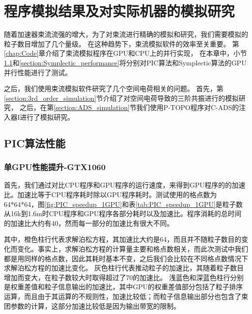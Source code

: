 \chapter{程序模拟结果及对实际机器的模拟研究} \label{chap:Simulation}
随着加速器束流流强的增大，为了对束流进行精确的模拟和研究，我们需要模拟的粒子数目增加了几个量级。
在这种趋势下，束流模拟软件的效率至关重要。
第\ref{chap:Code}章介绍了束流模拟程序在GPU和CPU上的并行实现，
在本章中，小节\ref{section:PIC_performance}和\ref{section:Symplectic_performance}将分别对PIC算法和Symplectic算法的GPU并行性能进行了测试。

之后，我们使用束流模拟软件研究了几个空间电荷相关的问题。
首先，第\ref{section:3rd_order_simulation}节介绍了对空间电荷导致的三阶共振进行的模拟研究，
之后，在第\ref{section:ADS_simulation}节我们使用P-TOPO程序对C-ADS的注入器I进行了模拟研究。

\section{PIC算法性能}             \label{section:PIC_performance}

\subsection{单GPU性能提升-GTX1060}
首先，我们通过对比CPU程序和GPU程序的运行速度，来得到GPU程序的的加速比。加速比等于CPU程序耗时除以GPU程序耗时。测试使用的格点数为 64*64*64，图\ref{fig:PIC_speedup_1GPU}和表\ref{tab:PIC_speedup_1GPU}是粒子数从16k到1.6m时CPU程序和GPU程序各部分耗时以及加速比。程序消耗的总时间的加速比大约有40，然而每一部分的加速比有很大不同。

其中，橙色柱行代表求解泊松方程，其加速比大约是64，而且并不随粒子数目的变化而变化。事实上，求解泊松方程的计算量主要和格点数相关，而此次测试中我们都是用同样的格点数，因此其耗时基本不变，之后我们会比较在不同格点数情况下求解泊松方程的加速比变化。
灰色柱行代表推动粒子的加速比，其随着粒子数目增加而变大，在粒子数较大时取得超过了70的加速比。
浅蓝色和深蓝色柱行分别是权重差值和粒子信息输出的加速比，其中GPU的权重差值部分包括了粒子排序运算，而且由于其运算的不规则性，加速比较低；而粒子信息输出部分也包含了束团参数的计算，这部分加速比较低是因为输出带宽的限制。


